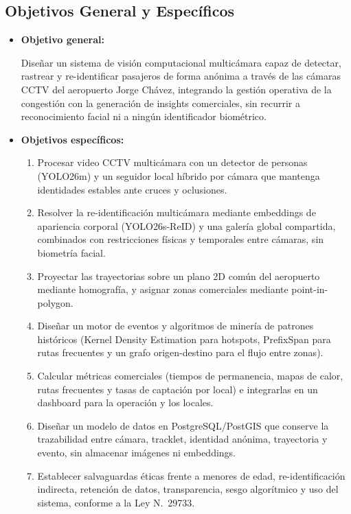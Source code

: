 \documentclass[12pt,letterpaper]{article}
\begin{document}
\subsection{Objetivos General y Específicos}

\begin{itemize}
    \item \textbf{Objetivo general:}

    Diseñar un sistema de visión computacional multicámara capaz de
    detectar, rastrear y re-identificar pasajeros de forma anónima a
    través de las cámaras CCTV del aeropuerto Jorge Chávez, integrando la
    gestión operativa de la congestión con la generación de insights
    comerciales, sin recurrir a reconocimiento facial ni a ningún
    identificador biométrico.

    \item \textbf{Objetivos específicos:}
    \begin{enumerate}
        \item Procesar video CCTV multicámara con un detector de personas
        (YOLO26m) y un seguidor local híbrido por cámara que mantenga
        identidades estables ante cruces y oclusiones.
        \item Resolver la re-identificación multicámara mediante
        embeddings de apariencia corporal (YOLO26s-ReID) y una galería
        global compartida, combinados con restricciones físicas y
        temporales entre cámaras, sin biometría facial.
        \item Proyectar las trayectorias sobre un plano 2D común del
        aeropuerto mediante homografía, y asignar zonas comerciales
        mediante point-in-polygon.
        \item Diseñar un motor de eventos y algoritmos de minería de
        patrones históricos (Kernel Density Estimation para hotspots,
        PrefixSpan para rutas frecuentes y un grafo origen-destino para
        el flujo entre zonas).
        \item Calcular métricas comerciales (tiempos de permanencia,
        mapas de calor, rutas frecuentes y tasas de captación por local)
        e integrarlas en un dashboard para la operación y los locales.
        \item Diseñar un modelo de datos en PostgreSQL/PostGIS que
        conserve la trazabilidad entre cámara, tracklet, identidad
        anónima, trayectoria y evento, sin almacenar imágenes ni
        embeddings.
        \item Establecer salvaguardas éticas frente a menores de edad,
        re-identificación indirecta, retención de datos, transparencia,
        sesgo algorítmico y uso del sistema, conforme a la Ley
        N.\textdegree~29733.
    \end{enumerate}
\end{itemize}
\end{document}
